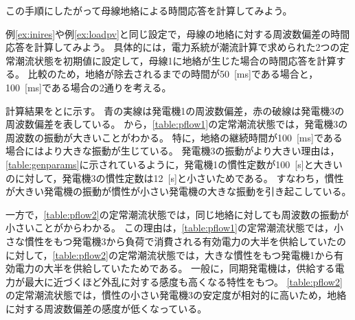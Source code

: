 \documentclass[tombow,dvipdfmx]{corona-a5-1.1}
\begin{document}
この手順にしたがって母線地絡による時間応答を計算してみよう。

\begin{例}[母線地絡に対する電力系統モデルの時間応答]\label{ex:busflt}
例\ref{ex:inires}や例\ref{ex:loadpv}と同じ設定で，母線の地絡に対する周波数偏差の時間応答を計算してみよう。
具体的には，電力系統が潮流計算で求められた2つの定常潮流状態を初期値に設定して，母線1に地絡が生じた場合の時間応答を計算する。
比較のため，地絡が除去されるまでの時間が50~[ms]である場合と，100~[ms]である場合の2通りを考える。

計算結果をとに示す。
青の実線は発電機1の周波数偏差，赤の破線は発電機3の周波数偏差を表している。
から，\ref{table:pflow1}の定常潮流状態では，発電機3の周波数の振動が大きいことがわかる。
特に，地絡の継続時間が100~[ms]である場合にはより大きな振動が生じている。
発電機3の振動がより大きい理由は，\ref{table:genparams}に示されているように，発電機1の慣性定数が100~[s]と大きいのに対して，発電機3の慣性定数は12~[s]と小さいためである。
すなわち，慣性が大きい発電機の振動が慣性が小さい発電機の大きな振動を引き起こしている。

一方で，\ref{table:pflow2}の定常潮流状態では，同じ地絡に対しても周波数の振動が小さいことがからわかる。
この理由は，\ref{table:pflow1}の定常潮流状態では，小さな慣性をもつ発電機3から負荷で消費される有効電力の大半を供給していたのに対して，\ref{table:pflow2}の定常潮流状態では，大きな慣性をもつ発電機1から有効電力の大半を供給していたためである。
一般に，同期発電機は，供給する電力が最大に近づくほど外乱に対する感度も高くなる特性をもつ。
\ref{table:pflow2}の定常潮流状態では，慣性の小さい発電機3の安定度が相対的に高いため，地絡に対する周波数偏差の感度が低くなっている。
\end{例}
\end{document}
